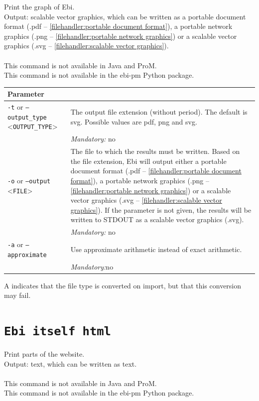 {\label{command:Ebi itself graph}
Print the graph of Ebi.\\
\noindent Output: scalable vector graphics, which can be written as a portable document format (.pdf -- \cref{filehandler:portable document format}), a portable network graphics (.png -- \cref{filehandler:portable network graphics}) or a scalable vector graphics (.svg -- \cref{filehandler:scalable vector graphics}).\\
\\This command is not available in Java and ProM.
\\This command is not available in the ebi-pm Python package.
\begin{tabularx}{\linewidth}{lX}
\toprule
Parameter \\\midrule
\texttt{-t} or \texttt{--output\_type} <\texttt{OUTPUT\_TYPE}> &
The output file extension (without period). The default is svg. Possible values are pdf, png and svg.\\
&\textit{Mandatory:} \quad no\\
\texttt{-o} or \texttt{--output} <\texttt{FILE}> &
The file to which the results must be written. Based on the file extension, Ebi will output either a portable document format (.pdf -- \cref{filehandler:portable document format}), a portable network graphics (.png -- \cref{filehandler:portable network graphics}) or a scalable vector graphics (.svg -- \cref{filehandler:scalable vector graphics}).
If the parameter is not given, the results will be written to STDOUT as a scalable vector graphics (.svg).\\
&\textit{Mandatory:} \quad no\\
\texttt{-a} or \texttt{--approximate} & Use approximate arithmetic instead of exact arithmetic.\\
&\textit{Mandatory:}\quad no\\
\bottomrule
\end{tabularx}
A \textdagger{} indicates that the file type is converted on import, but that this conversion may fail.
\clearpage\section{\texttt{Ebi itself html}}
\label{command:Ebi itself html}
Print parts of the website.\\
\noindent Output: text, which can be written as  text.\\
\\This command is not available in Java and ProM.
\\This command is not available in the ebi-pm Python package.
}
